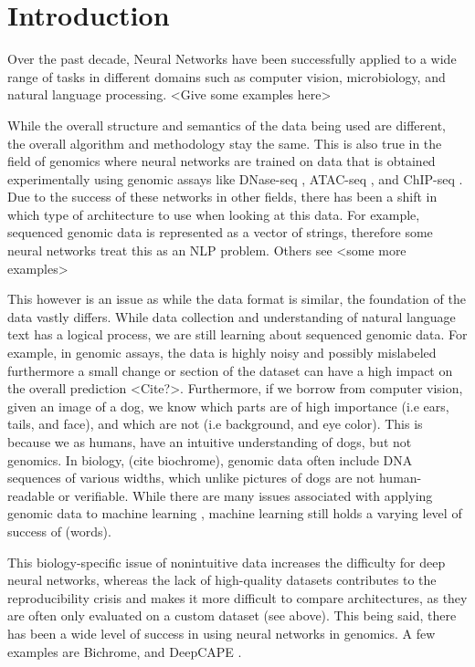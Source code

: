 \section*{Introduction}

Over the past decade, Neural Networks have been successfully applied to a wide range of tasks in different domains such as computer vision, microbiology, and natural language processing. <Give some examples here>

While the overall structure and semantics of the data being used are different, the overall algorithm and methodology stay the same. This is also true in the field of genomics where neural networks are trained on data that is obtained experimentally using genomic assays like DNase-seq \cite{song2010dnase}, ATAC-seq \cite{buenrostro2015atac}, and ChIP-seq \cite{park2009chip}. Due to the success of these networks in other fields, there has been a shift in which type of architecture to use when looking at this data. For example, sequenced genomic data is represented as a vector of strings, therefore some neural networks treat this as an NLP problem. Others see <some more examples>

This however is an issue as while the data format is similar, the foundation of the data vastly differs. While data collection and understanding of natural language text has a logical process, we are still learning about sequenced genomic data. For example, in genomic assays, the data is highly noisy and possibly mislabeled furthermore a small change or section of the dataset can have a high impact on the overall prediction <Cite?>. Furthermore, if we borrow from computer vision, given an image of a dog, we know which parts are of high importance (i.e ears, tails, and face), and which are not (i.e background, and eye color). This is because we as humans, have an intuitive understanding of dogs, but not genomics. In biology, (cite biochrome), genomic data often include DNA sequences of various widths, which unlike pictures of dogs are not human-readable or verifiable. While there are many issues associated with applying genomic data to machine learning \cite{whalen2022navigating}, machine learning still holds a varying level of success of (words).

This biology-specific issue of nonintuitive data increases the difficulty for deep neural networks, whereas the lack of high-quality datasets contributes to the reproducibility crisis and makes it more difficult to compare architectures, as they are often only evaluated on a custom dataset (see above). This being said, there has been a wide level of success in using neural networks in genomics. A few examples are Bichrome, and DeepCAPE \cite{chen2021deepcape}.


